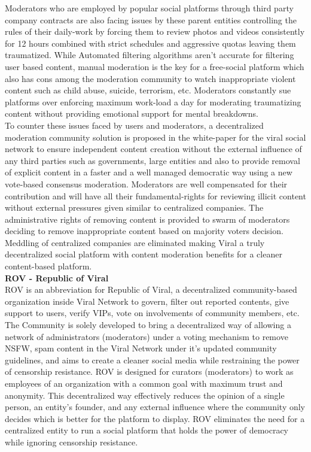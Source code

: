 \documentclass[conference]{IEEEtran}
\begin{document}
Moderators who are employed by popular social platforms through third party company contracts are also facing issues by these parent entities controlling the rules of their daily-work by forcing them to review photos and videos consistently for 12 hours combined with strict schedules and aggressive quotas leaving them traumatized. While Automated filtering algorithms aren't accurate for filtering user based content, manual moderation is the key for a free-social platform which also has cons among the moderation community to watch inappropriate violent content such as child abuse, suicide, terrorism, etc. Moderators constantly sue platforms over enforcing maximum work-load a day for moderating traumatizing content without providing emotional support for mental breakdowns.\\

To counter these issues faced by users and moderators, a decentralized moderation community solution is proposed in the white-paper for the viral social network to ensure independent content creation without the external influence of any third parties such as governments, large entities and also to provide removal of explicit content in a faster and a well managed democratic way using a new vote-based consensus moderation. Moderators are well compensated for their contribution and will have all their fundamental-rights for reviewing illicit content without external pressures given similar to centralized companies. The administrative rights of removing content is provided to swarm of moderators deciding to remove inappropriate content based on majority voters decision. Meddling of centralized companies are eliminated making Viral a truly decentralized social platform with content moderation benefits for a cleaner content-based platform.\\

\textbf{ROV - Republic of Viral}\\

ROV is an abbreviation for Republic of Viral, a decentralized community-based organization inside Viral Network to govern, filter out reported contents, give support to users, verify VIPs, vote on involvements of community members, etc. The Community is solely developed to bring a decentralized way of allowing a network of administrators (moderators) under a voting mechanism to remove NSFW, spam content in the Viral Network under it's updated community guidelines, and aims to create a cleaner social media while restraining the power of censorship resistance. ROV is designed for curators (moderators) to work as employees of an organization with a common goal with maximum trust and anonymity. This decentralized way effectively reduces the opinion of a single person, an entity’s founder, and any external influence where the community only decides which is better for the platform to display. ROV eliminates the need for a centralized entity to run a social platform that holds the power of democracy while ignoring censorship resistance. \\
\end{document}
